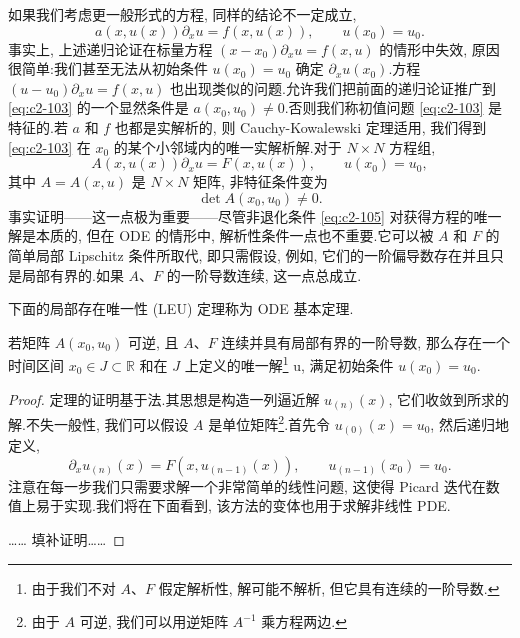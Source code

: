 如果我们考虑更一般形式的方程, 同样的结论不一定成立,
\begin{equation}
a(x, u(x)) \partial_{x} u = f(x, u(x)), \qquad u(x_{0}) = u_{0}. \label{eq:c2-103}
\end{equation}
事实上, 上述递归论证在标量方程 $(x - x_{0}) \partial_{x} u = f(x, u)$ 的情形中失效, 原因很简单:我们甚至无法从初始条件 $u(x_{0}) = u_{0}$ 确定 $\partial_{x} u(x_{0})$.方程 $(u - u_{0}) \partial_{x} u = f(x, u)$ 也出现类似的问题.允许我们把前面的递归论证推广到 \eqref{eq:c2-103} 的一个显然条件是 $a(x_{0}, u_{0}) \neq 0$.否则我们称初值问题 \eqref{eq:c2-103} 是特征的.若 $a$ 和 $f$ 也都是实解析的, 则 Cauchy-Kowalewski 定理适用, 我们得到 \eqref{eq:c2-103} 在 $x_{0}$ 的某个小邻域内的唯一实解析解.对于 $N \times N$ 方程组,
\begin{equation}
A(x, u(x)) \partial_{x} u = F(x, u(x)), \qquad u(x_{0}) = u_{0}, \label{eq:c2-104}
\end{equation}
其中 $A = A(x, u)$ 是 $N \times N$ 矩阵, 非特征条件变为
\begin{equation}
\det A(x_{0}, u_{0}) \neq 0. \label{eq:c2-105}
\end{equation}
事实证明——这一点极为重要——尽管非退化条件 \eqref{eq:c2-105} 对获得方程的唯一解是本质的, 但在 ODE 的情形中, 解析性条件一点也不重要.它可以被 $A$ 和 $F$ 的简单局部 Lipschitz 条件所取代, 即只需假设, 例如, 它们的一阶偏导数存在并且只是局部有界的.如果 $A$、$F$ 的一阶导数连续, 这一点总成立.

下面的局部存在唯一性 (LEU) 定理称为 ODE 基本定理.

\begin{theorem*}[常微分方程基本定理]
若矩阵 $A(x_{0}, u_{0})$ 可逆, 且 $A$、$F$ 连续并具有局部有界的一阶导数, 那么存在一个时间区间 $x_{0} \in J \subset \mathbb{R}$ 和在 $J$ 上定义的唯一解\footnote{由于我们不对 $A$、$F$ 假定解析性, 解可能不解析, 但它具有连续的一阶导数.} u, 满足初始条件 $u(x_{0}) = u_{0}$.
\end{theorem*}

\begin{proof}
定理的证明基于法.其思想是构造一列逼近解 $u_{(n)}(x)$, 它们收敛到所求的解.不失一般性, 我们可以假设 $A$ 是单位矩阵\footnote{由于 $A$ 可逆, 我们可以用逆矩阵 $A^{-1}$ 乘方程两边.}.首先令 $u_{(0)}(x) = u_{0}$, 然后递归地定义,
\begin{equation}
\partial_{x} u_{(n)}(x) = F(x, u_{(n-1)}(x)), \qquad u_{(n-1)}(x_{0}) = u_{0}. \label{eq:c2-106}
\end{equation}
注意在每一步我们只需要求解一个非常简单的线性问题, 这使得 Picard 迭代在数值上易于实现.我们将在下面看到, 该方法的变体也用于求解非线性 PDE.

\ldots\ldots{} 填补证明\ldots\ldots
\end{proof}

